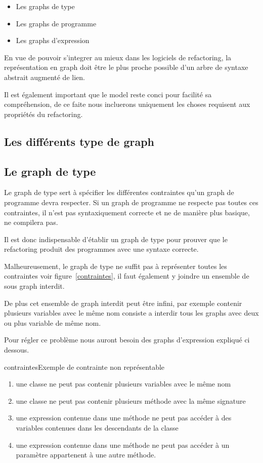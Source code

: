 \documentclass[a4paper, 12pt]{article}
\begin{document}
\begin{itemize}
\item Les graphs de type
\item Les graphs de programme
\item Les graphs d'expression
\end{itemize}

En vue de pouvoir s'integrer au mieux dans les logiciels de refactoring, la représentation en graph doit être le plus proche possible d'un arbre de syntaxe abstrait augmenté de lien.

Il est également important que le model reste conci pour facilité sa compréhension, de ce faite nous incluerons uniquement les choses requisent aux propriétés du refactoring.

\subsection{Les différents type de graph}

\subsection{Le graph de type}

Le graph de type sert à spécifier les différentes contraintes qu'un graph de programme devra respecter. Si un graph de programme ne respecte pas toutes ces contraintes, il n'est pas syntaxiquement correcte et ne de manière plus basique, ne compilera pas.

Il est donc indispensable d'établir un graph de type pour prouver que le refactoring produit des programmes avec une syntaxe correcte.

Malheureusement, le graph de type ne suffit pas à représenter toutes les contraintes voir figure~\ref{contraintes}, il faut également y joindre un ensemble de sous graph interdit.

De plus cet ensemble de graph interdit peut être infini, par exemple contenir plusieurs variables avec le même nom consiste a interdir tous les graphs avec deux ou plus variable de même nom.

Pour régler ce problème nous auront besoin des graphs d'expression expliqué ci dessous.\label{subsec:graphExpression}


\begin{myfig}{contraintes}{Exemple de contrainte non représentable}
\begin{enumerate}
 \scriptsize \item une classe ne peut pas contenir plusieurs variables avec le même nom
 \scriptsize \item une classe ne peut pas contenir plusieurs méthode avec la même signature
 \scriptsize \item une expression contenue dans une méthode ne peut pas accéder à des variables contenues dans les descendants de la classe
 \scriptsize \item une expression contenue dans une méthode ne peut pas accéder à un paramètre appartenent à une autre méthode.
\end{enumerate}
\end{myfig}
\end{document}
